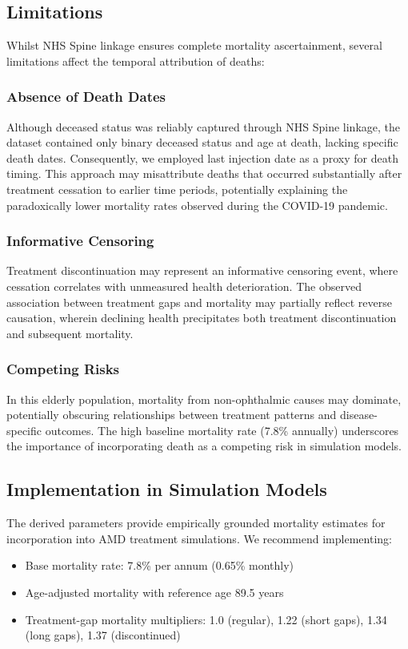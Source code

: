 \subsection{Limitations}
Whilst NHS Spine linkage ensures complete mortality ascertainment, several limitations affect the temporal attribution of deaths:

\subsubsection{Absence of Death Dates}
Although deceased status was reliably captured through NHS Spine linkage, the dataset contained only binary deceased status and age at death, lacking specific death dates. Consequently, we employed last injection date as a proxy for death timing. This approach may misattribute deaths that occurred substantially after treatment cessation to earlier time periods, potentially explaining the paradoxically lower mortality rates observed during the COVID-19 pandemic.

\subsubsection{Informative Censoring}
Treatment discontinuation may represent an informative censoring event, where cessation correlates with unmeasured health deterioration. The observed association between treatment gaps and mortality may partially reflect reverse causation, wherein declining health precipitates both treatment discontinuation and subsequent mortality.

\subsubsection{Competing Risks}
In this elderly population, mortality from non-ophthalmic causes may dominate, potentially obscuring relationships between treatment patterns and disease-specific outcomes. The high baseline mortality rate (7.8\% annually) underscores the importance of incorporating death as a competing risk in simulation models.

\subsection{Implementation in Simulation Models}
The derived parameters provide empirically grounded mortality estimates for incorporation into AMD treatment simulations. We recommend implementing:

\begin{itemize}
    \item Base mortality rate: 7.8\% per annum (0.65\% monthly)
    \item Age-adjusted mortality with reference age 89.5 years
    \item Treatment-gap mortality multipliers: 1.0 (regular), 1.22 (short gaps), 1.34 (long gaps), 1.37 (discontinued)
\end{itemize}

